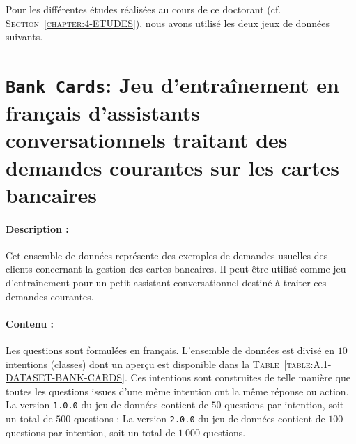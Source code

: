 \label{annex:A-ANNEXE-DATASET}

Pour les différentes études réalisées au cours de ce doctorant (cf. \textsc{Section~\ref{chapter:4-ETUDES}}), nous avons utilisé les deux jeux de données suivants.

\minitoc


\section{\texttt{Bank Cards}: Jeu d'entraînement en français d'assistants conversationnels traitant des demandes courantes sur les cartes bancaires}
\label{annex:A.1-DATASET-BANK-CARDS}
	
	
	\paragraph{Description :}
	Cet ensemble de données représente des exemples de demandes usuelles des clients concernant la gestion des cartes bancaires.
	Il peut être utilisé comme jeu d'entraînement pour un petit assistant conversationnel destiné à traiter ces demandes courantes.
	
	\paragraph{Contenu :}
	Les questions sont formulées en français.
	L'ensemble de données est divisé en $10$ intentions (classes) dont un aperçu est disponible dans la \textsc{Table~\ref{table:A.1-DATASET-BANK-CARDS}}.
	Ces intentions sont construites de telle manière que toutes les questions issues d'une même intention ont la même réponse ou action.
	La version \texttt{1.0.0} du jeu de données contient de $50$ questions par intention, soit un total de $500$ questions ;
	La version \texttt{2.0.0} du jeu de données contient de $100$ questions par intention, soit un total de $1~000$ questions.
	
